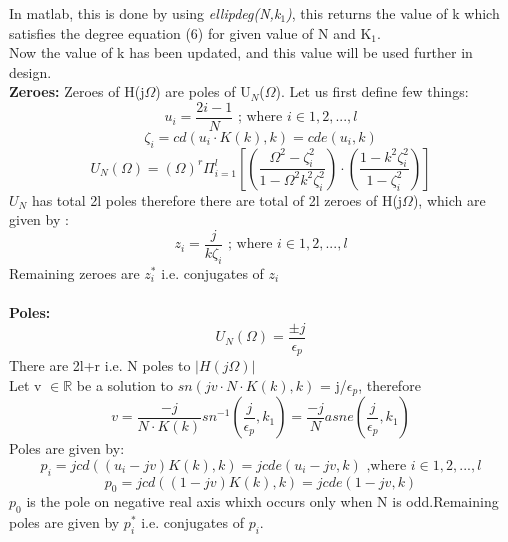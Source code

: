 \documentclass{article}
\begin{document}
In matlab, this is done by using \textit{ellipdeg(N,k$_1$)}, this returns the value of k which satisfies the degree equation (6) for given value of N and K$_1$.\\
Now the value of k has been updated, and this value will be used further in design.\\
\textbf{Zeroes:} Zeroes of H(j$\Omega$) are poles of U$_N$($\Omega$).
Let us first define few things:
\begin{equation*}
    u_i = \frac{2i-1}{N}\text{ ; where } i \in {1,2,...,l}
\end{equation*}
\begin{equation*}
    \zeta_i = cd(u_i\cdot K(k),k) = \textit{cde}(u_i,k)
\end{equation*}
\begin{equation}
    U_N(\Omega) = (\Omega)^r\Pi_{i=1}^l\left[\left(\frac{\Omega^2-\zeta_i^2}{1-\Omega^2k^2\zeta_i^2}\right)\cdot\left(\frac{1-k^2\zeta_i^2}{1-\zeta_i^2}\right)\right]
\end{equation}
$U_N$ has total 2l poles therefore there are total of 2l zeroes of H(j$\Omega$), which are given by : 
\begin{equation}
    z_i = \frac{j}{k\zeta_i}\text{ ; where } i \in {1,2,...,l}
\end{equation}
Remaining zeroes are $z_i^*$ i.e. conjugates of $z_i$\\
\\
\textbf{Poles:}
\begin{equation*}
    U_N(\Omega) = \frac{\pm j}{\epsilon_p}
\end{equation*}
There are 2l+r i.e. N poles to $|H(j\Omega)|$\\
Let v $\in \mathbb{R}$ be a solution to $sn(jv\cdot N\cdot K(k),k)$ = j/$\epsilon_p$, therefore
\begin{equation}
    v = \frac{-j}{N\cdot K(k)}sn^{-1}(\frac{j}{\epsilon_p},k_1) = \frac{-j}{N}asne(\frac{j}{\epsilon_p},k_1)
\end{equation}
Poles are given by:
\begin{equation}
    p_i = jcd((u_i-jv)K(k),k) = jcde(u_i-jv,k)\text{ ,where } i\in {1,2,...,l}
\end{equation}
\begin{equation}
    p_0 = jcd((1-jv)K(k),k) = jcde(1-jv,k)
\end{equation}
$p_0$ is the pole on negative real axis whixh occurs only when N is odd.Remaining poles are given by $p_i^*$ i.e. conjugates of $p_i$.\\
\end{document}
